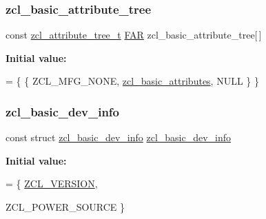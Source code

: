 \subsubsection{\texorpdfstring{zcl\+\_\+basic\+\_\+attribute\+\_\+tree}{zcl\_basic\_attribute\_tree}}
{\footnotesize\ttfamily const \hyperlink{structzcl__attribute__tree__t}{zcl\+\_\+attribute\+\_\+tree\+\_\+t} \hyperlink{group__hal_gaef060b3456fdcc093a7210a762d5f2ed}{F\+AR} zcl\+\_\+basic\+\_\+attribute\+\_\+tree\mbox{[}$\,$\mbox{]}}

{\bfseries Initial value\+:}
\begin{DoxyCode}
=
                           \{ \{ ZCL\_MFG\_NONE, \hyperlink{group__zcl__basic_ga721ebe2f6ae346632475cf178671d150}{zcl\_basic\_attributes}, NULL \} \}
\end{DoxyCode}
\mbox{\label{group__zcl__basic_ga739c59514b0eb0caee5541062c8e1ce8}} 
\subsubsection{\texorpdfstring{zcl\+\_\+basic\+\_\+dev\+\_\+info}{zcl\_basic\_dev\_info}}
{\footnotesize\ttfamily const struct \hyperlink{structzcl__basic__dev__info}{zcl\+\_\+basic\+\_\+dev\+\_\+info}  \hyperlink{structzcl__basic__dev__info}{zcl\+\_\+basic\+\_\+dev\+\_\+info}}

{\bfseries Initial value\+:}
\begin{DoxyCode}
= \{
   \hyperlink{group__zcl__basic_ga677e87e13981dedcd3b370ede4902c54}{ZCL\_VERSION},









   ZCL\_POWER\_SOURCE
\}
\end{DoxyCode}
